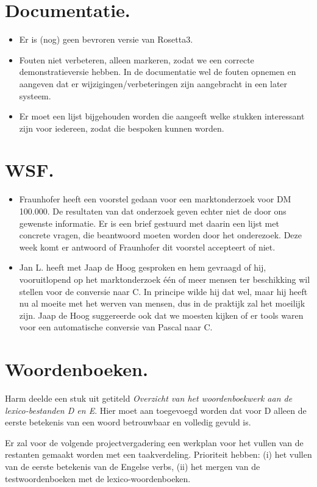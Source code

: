 \section{Documentatie.}
\begin{itemize}
   \item Er is (nog) geen bevroren versie van Rosetta3.
   \item Fouten niet verbeteren, alleen markeren, zodat we een correcte 
demonstratieversie hebben. In de documentatie wel de fouten opnemen en aangeven
dat er wijzigingen/verbeteringen zijn aangebracht in een later systeem.
   \item Er moet een lijst bijgehouden worden die aangeeft welke stukken 
interessant zijn voor iedereen, zodat die bespoken kunnen worden.
\end{itemize}

\section{WSF.}
\begin{itemize}
  \item Fraunhofer heeft een voorstel gedaan voor een marktonderzoek voor DM 
100.000. De resultaten van dat onderzoek geven echter niet de door ons gewenste
informatie. Er is een brief gestuurd met daarin een lijst met concrete vragen, 
die beantwoord moeten worden door het onderezoek. Deze week komt er antwoord of 
Fraunhofer dit voorstel accepteert of niet.
  \item Jan L. heeft met Jaap de Hoog gesproken en hem gevraagd of hij, 
vooruitlopend op het marktonderzoek \'{e}\'{e}n of meer mensen ter beschikking 
wil stellen voor de conversie naar C. In principe wilde hij dat wel, maar hij 
heeft nu al moeite met het werven van mensen, dus in de praktijk zal het 
moeilijk zijn. Jaap de Hoog suggereerde ook dat we moesten kijken of er tools 
waren voor een automatische conversie van Pascal naar C.
\end{itemize}


\section{Woordenboeken.}
Harm deelde een stuk uit getiteld {\em Overzicht van het woordenboekwerk aan de 
lexico-bestanden D en E}. Hier moet aan toegevoegd worden dat voor D alleen de 
eerste betekenis van een woord betrouwbaar en volledig gevuld is.

Er zal voor de volgende projectvergadering een werkplan voor het vullen van de 
restanten gemaakt worden met een taakverdeling. Prioriteit hebben: (i) het
vullen van de eerste betekenis van de Engelse verbs, (ii) het mergen van de
testwoordenboeken met de lexico-woordenboeken. 

